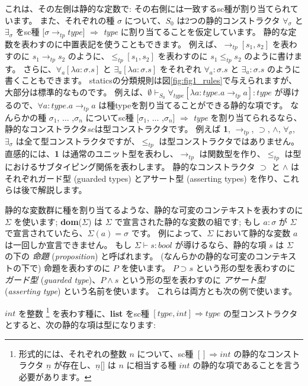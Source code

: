 \documentclass[submit,techreq,noauthor,onecolumn]{ipsj}
\begin{document}
\noindent これは、その左側は静的な定数で: その右側には一致するsc種が割り当てられています。
また、それぞれの種 $\sigma$ について、$S_0$ は2つの静的コンストラクタ $\forall_\sigma$ と $\exists_\sigma$ をsc種 [$\sigma \rightarrow_{tp} type$] $\Rightarrow$ {\it type} に割り当てることを仮定しています。
静的な定数を表わすのに中置表記を使うこともできます。
例えば、$\rightarrow_{tp} [s_1,s_2]$ を表わすのに $s_1 \rightarrow_{tp} s_2$ のように、$\leq_{tp} [s_1,s_2]$ を表わすのに $s_1 \leq_{tp} s_2$ のように書けます。
さらに、$\forall_a [\lambda a : \sigma.s]$ と $\exists_a [\lambda a : \sigma.s]$ をそれぞれ $\forall_a : \sigma.s$ と $\exists_a : \sigma.s$ のように書くこともできます。
staticsの分類規則は図\ref{fig:fig1_rules}で与えられますが、大部分は標準的なものです。
例えば、$\emptyset \vdash_{S_0} \forall_{type} [\lambda a : type.a \rightarrow_{tp} a] : type$ が導けるので、$\forall a : type.a \rightarrow_{tp} a$ は種typeを割り当てることができる静的な項です。
なんらかの種 $\sigma_1$, $\ldots$ ,$\sigma_n$ についてsc種 [$\sigma_1$, $\ldots$ ,$\sigma_n$] $\Rightarrow$ {\it type} を割り当てられるなら、静的なコンストラクタ$sc$は型コンストラクタです。
例えば {\bf 1}, $\rightarrow_{tp}$, $\supset$, $\wedge$, $\forall_\sigma$, $\exists_\sigma$ は全て型コンストラクタですが、$\leq_{tp}$ は型コンストラクタではありません。
直感的には、{\bf 1} は通常のユニット型を表わし、$\rightarrow_{tp}$ は関数型を作り、$\leq_{tp}$ は型におけるサブタイピング関係を表わします。
静的なコンストラクタ $\supset$ と $\wedge$ はそれぞれガード型 (guarded types) とアサート型 (asserting types) を作り、これらは後で解説します。

静的な変数群に種を割り当てるような、静的な可変のコンテキストを表わすのに $\Sigma$ を使います;
{\bf dom}($\Sigma$) は $\Sigma$ で宣言された静的な変数の組です;
もし $a : \sigma$ が $\Sigma$ で宣言されていたら、$\Sigma (a) = \sigma$ です。
例によって、$\Sigma$ において静的な変数 $a$ は一回しか宣言できません。
もし $\Sigma \vdash s : bool$ が導けるなら、静的な項 $s$ は $\Sigma$ の下の {\it 命題} ({\it proposition}) と呼ばれます。
(なんらかの静的な可変のコンテキストの下で) 命題を表わすのに $P$ を使います。
$P \supset s$ という形の型を表わすのに {\it ガード型} ({\it guarded type})、$P \wedge s$ という形の型を表わすのに {\it アサート型} ({\it asserting type}) という名前を使います。
これらは両方とも次の例で使います。

$int$ を整数
\footnote{形式的には、それぞれの整数 $n$ について、sc種 $[] \Rightarrow int$ の静的なコンストラクタ $\underline n$ が存在し、$\underline n$[] は $n$ に相当する種 $int$ の静的な項であることを言う必要があります。
}
を表わす種に、{\bf list} をsc種 $[type,int] \Rightarrow type$ の型コンストラクタとすると、次の静的な項は型になります:
\end{document}
